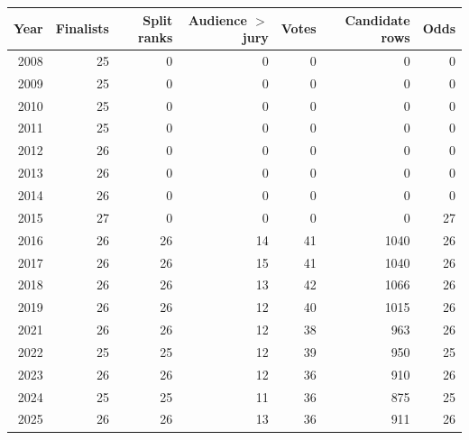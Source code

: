 \begin{tabular}{rrrrrrr}
\toprule
Year & Finalists & Split ranks & Audience $>$ jury & Votes & Candidate rows & Odds \\
\midrule
2008 & 25 & 0 & 0 & 0 & 0 & 0 \\
2009 & 25 & 0 & 0 & 0 & 0 & 0 \\
2010 & 25 & 0 & 0 & 0 & 0 & 0 \\
2011 & 25 & 0 & 0 & 0 & 0 & 0 \\
2012 & 26 & 0 & 0 & 0 & 0 & 0 \\
2013 & 26 & 0 & 0 & 0 & 0 & 0 \\
2014 & 26 & 0 & 0 & 0 & 0 & 0 \\
2015 & 27 & 0 & 0 & 0 & 0 & 27 \\
2016 & 26 & 26 & 14 & 41 & 1040 & 26 \\
2017 & 26 & 26 & 15 & 41 & 1040 & 26 \\
2018 & 26 & 26 & 13 & 42 & 1066 & 26 \\
2019 & 26 & 26 & 12 & 40 & 1015 & 26 \\
2021 & 26 & 26 & 12 & 38 & 963 & 26 \\
2022 & 25 & 25 & 12 & 39 & 950 & 25 \\
2023 & 26 & 26 & 12 & 36 & 910 & 26 \\
2024 & 25 & 25 & 11 & 36 & 875 & 25 \\
2025 & 26 & 26 & 13 & 36 & 911 & 26 \\
\bottomrule
\end{tabular}
